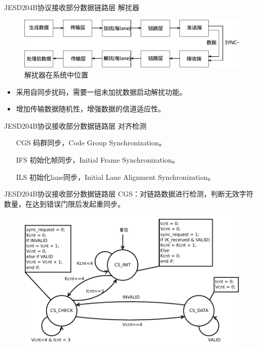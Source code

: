 \documentclass{beamer}
\begin{document}
\begin{frame}{JESD204B协议接收部分}{数据链路层}
  解扰器
  \begin{figure}
	\centering
	\includegraphics[scale=0.65]{./img/functional_location_of_scrambler_and_descrambler.pdf}
	\caption{解扰器在系统中位置}
	\end{figure}
  \begin{itemize}
  \item 采用自同步扰码，需要一组未加扰数据启动解扰功能。
  \item 增加传输数据随机性，增强数据的信道适应性。
  \end{itemize}
\end{frame}

\begin{frame}{JESD204B协议接收部分}{数据链路层}
  对齐检测
  \begin{itemize}
  \item [CGS] 码群同步，Code Group Synchronization。
  \item [IFS] 初始化帧同步，Initial Frame Synchronization。
  \item [ILS] 初始化lane同步，Initial Lane Alignment Synchronization。
  \end{itemize}
\end{frame}

\begin{frame}{JESD204B协议接收部分}{数据链路层}
  CGS：对链路数据进行检测，判断无效字符数量，在达到错误门限后发起重同步。
  \begin{figure}
	\centering
	\includegraphics[scale=0.5]{./img/cgs_fsm.pdf}
	\end{figure}
\end{frame}
\end{document}
